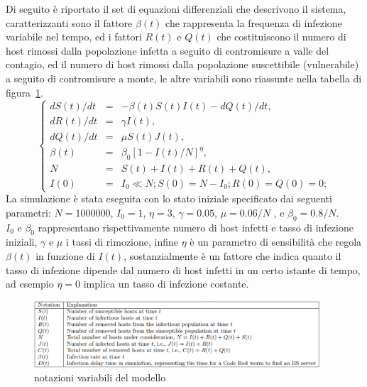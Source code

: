 Di seguito è riportato il set di equazioni differenziali che descrivono il sistema, caratterizzanti sono il fattore $\beta(t)$ che rappresenta la frequenza di infezione variabile nel tempo, ed i fattori $R(t)$ e $Q(t)$ che costituiscono il numero di host rimossi dalla popolazione infetta a seguito di contromisure a valle del contagio, ed il numero di host rimossi dalla popolazione suscettibile (vulnerabile) a seguito di contromisure a monte, le altre variabili sono riassunte nella tabella di figura~\ref{notations}.\\
\begin{equation}
\left\{  \begin{array}{rcl} 
                dS(t)/dt &=& -\beta(t)S(t)I(t) - dQ(t)/dt, \\ 
                dR(t)/dt &=& \gamma I(t), \\ 
                dQ(t)/dt &=& \mu S(t)J(t), \\ 
                \beta(t) &=& \beta_{0}[1 - I(t)/N]^{\eta}, \\ 
                N &=& S(t) + I(t) + R(t) + Q(t), \\
                I(0) &=& I_{0} \ll N; S(0) = N -I_{0}; R(0) = Q(0) = 0; 
           \end{array}  \right.
\end{equation}
La simulazione è stata eseguita con lo stato iniziale specificato dai seguenti parametri: $N = 1000000$, $I_{0} = 1$, $\eta = 3$, $\gamma = 0.05$, $\mu = 0.06/N$ , e $\beta_{0} = 0.8/N$.\\
$I_{0}$ e $\beta_{0}$ rappresentano rispettivamente numero di host infetti e tasso di infezione iniziali, $\gamma$ e $\mu$ i tassi di rimozione, infine $\eta$ è un parametro di sensibilità che regola $\beta(t)$ in funzione di $I(t)$, sostanzialmente è un fattore che indica quanto il tasso di infezione dipende dal numero di host infetti in un certo istante di tempo, ad esempio $\eta = 0$ implica un tasso di infezione costante.\\
\begin{figure}[!hbp]
\centering
\includegraphics[width=0.95\textwidth]{images/notations.eps}
\caption{notazioni variabili del modello}
\label{notations}
\end{figure}
